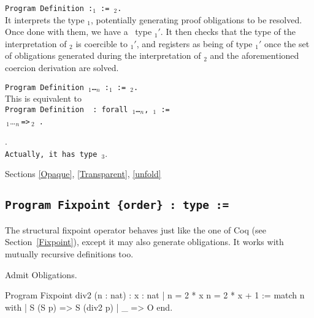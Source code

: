\begin{ErrMsgs}
\item {}
\end{ErrMsgs}

\begin{Variants}
\item {\tt Program Definition {\ident} {\tt :}{\term$_1$} :=
    {\term$_2$}.}\\
  It interprets the type {\term$_1$}, potentially generating proof
  obligations to be resolved. Once done with them, we have a \Coq\ type
  {\term$_1'$}. It then checks that the type of the interpretation of
  {\term$_2$} is coercible to {\term$_1'$}, and registers {\ident} as
  being of type {\term$_1'$} once the set of obligations generated
  during the interpretation of {\term$_2$} and the aforementioned
  coercion derivation are solved.
\item {\tt Program Definition {\ident} {\binder$_1$}\ldots{\binder$_n$}
       {\tt :}\term$_1$ {\tt :=} {\term$_2$}.}\\
  This is equivalent to \\
   {\tt Program Definition\,{\ident}\,{\tt :\,forall} %
       {\binder$_1$}\ldots{\binder$_n$}{\tt ,}\,\term$_1$\,{\tt :=}} \\
       \,{\binder$_1$}\ldots{\binder$_n$}\,{\tt =>}\,{\term$_2$}\,%
       {\tt .}
\end{Variants}

\begin{ErrMsgs}
\item {}.\\
    \texttt{Actually, it has type {\term$_3$}}.
\end{ErrMsgs}

\SeeAlso Sections \ref{Opaque}, \ref{Transparent}, \ref{unfold}

\subsection{\tt Program Fixpoint {\ident} {\params} {\tt \{order\}} : type := \term
  \label{ProgramFixpoint}}

The structural fixpoint operator behaves just like the one of Coq
(see Section~\ref{Fixpoint}), except it may also generate obligations.
It works with mutually recursive definitions too.

\begin{coq_eval}
Admit Obligations.
\end{coq_eval}
\begin{coq_example}
Program Fixpoint div2 (n : nat) : { x : nat | n = 2 * x \/ n = 2 * x + 1 } :=
  match n with
  | S (S p) => S (div2 p)
  | _ => O
  end.
\end{coq_example}

